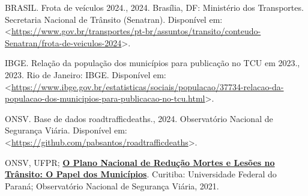 \documentclass[
  letterpaper,
  DIV=11,
  numbers=noendperiod]{scrreprt}
\newlength{\cslhangindent}
\newenvironment{CSLReferences}[2] %
 {\begin{list}{}{%
  \setlength{\itemindent}{0pt}
  \setlength{\leftmargin}{0pt}
  \setlength{\parsep}{0pt}
  \ifodd #1
   \setlength{\leftmargin}{\cslhangindent}
   \setlength{\itemindent}{-1\cslhangindent}
  \fi
  \setlength{\itemsep}{#2\baselineskip}}}
 {\end{list}}
\begin{document}
\label{refs}
\begin{CSLReferences}{0}{0}
BRASIL. Frota de veículos 2024., 2024. Brasília, DF: Ministério dos
Transportes. Secretaria Nacional de Trânsito (Senatran). Disponível em:
\textless{}\url{https://www.gov.br/transportes/pt-br/assuntos/transito/conteudo-Senatran/frota-de-veiculos-2024}\textgreater.

IBGE. Relação da população dos municípios para publicação no TCU em
2023., 2023. Rio de Janeiro: IBGE. Disponível em:
\textless{}\url{https://www.ibge.gov.br/estatisticas/sociais/populacao/37734-relacao-da-populacao-dos-municipios-para-publicacao-no-tcu.html}\textgreater.

ONSV. Base de dados roadtrafficdeaths., 2024. Observatório Nacional de
Segurança Viária. Disponível em:
\textless{}\url{https://github.com/pabsantos/roadtrafficdeaths}\textgreater.

ONSV, UFPR;
\textbf{\href{https://www.onsv.org.br/pdi/livro-pnatrans-o-papel-dos-municipios}{O
Plano Nacional de Redução Mortes e Lesões no Trânsito: O Papel dos
Municípios}}. Curitiba: Universidade Federal do Paraná; Observatório
Nacional de Segurança Viária, 2021.

\end{CSLReferences}
\end{document}
